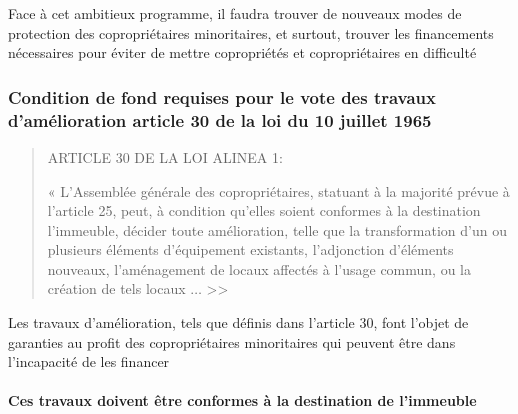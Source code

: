 		Face à cet ambitieux programme, il faudra trouver de nouveaux modes de protection des copropriétaires minoritaires, et surtout, trouver les financements nécessaires pour éviter de mettre copropriétés et copropriétaires en difficulté
		
		\subsubsection{Condition de fond requises pour le vote des travaux d’amélioration article 30 de la loi du 10 juillet 1965}
		
			\begin{quote}
				ARTICLE 30 DE LA LOI ALINEA 1:
				
				« L’Assemblée générale des copropriétaires, statuant à la majorité prévue à l'article 25, peut, à condition qu'elles soient conformes à la destination l'immeuble, décider toute amélioration, telle que la transformation d’un ou plusieurs éléments d’équipement existants, l’adjonction d’éléments nouveaux, l’aménagement de locaux affectés à l’usage commun, ou la création de tels locaux $\dots$ >>
			\end{quote}
			
			Les travaux d’amélioration, tels que définis dans l’article 30, font l’objet de garanties au profit des copropriétaires minoritaires qui peuvent être dans l’incapacité de les financer
			
			\paragraph{Ces travaux doivent être conformes à la destination de l’immeuble}
			
